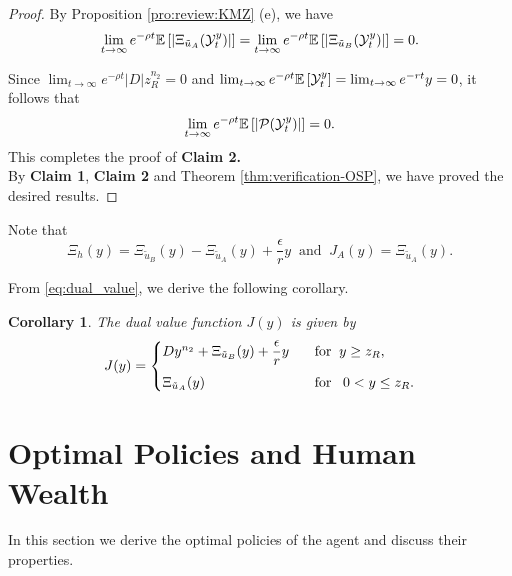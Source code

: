 \documentclass[a4paper,report, 11pt]{article}
\newtheorem{cor}{Corollary}[section]
\def\e{\epsilon}
\begin{document}
\begin{proof}
	By Proposition \ref{pro:review:KMZ} (e), we have 
	\begin{equation*}
		\lim_{t\to\infty}e^{-\rho t}\mathbb{E}\left[|\Xi_{\tilde{u}_A}({\cal Y}_t^y)|\right]=	\lim_{t\to\infty}e^{-\rho t}\mathbb{E}\left[|\Xi_{\tilde{u}_B}({\cal Y}_t^y)|\right]=0.
	\end{equation*}
	
	Since $\lim_{t\to\infty} e^{-\rho t}|D|z_R^{n_2}=0$ and $\lim_{t\to\infty}e^{-\rho t}\mathbb{E}\left[{\cal Y}_t^y\right]=\lim_{t\to\infty} e^{-rt}y=0$, it follows that 
	\begin{equation*}
	\lim_{t\to\infty}e^{-\rho t}\mathbb{E}\left[|{\cal P}({\cal Y}_t^y)|\right]=0.
	\end{equation*}
	This completes the proof of {\bf Claim 2.}\\
	
	\noindent By {\bf Claim 1}, {\bf Claim 2} and Theorem \ref{thm:verification-OSP},  we have proved the desired results.
\end{proof}

Note that 
\begin{equation*}
\Xi_h(y) = \Xi_{\tilde{u}_B}(y)-\Xi_{\tilde{u}_A}(y)+\dfrac{\e}{r}y\;\;\mbox{and}\;\;J_A(y)=\Xi_{\tilde{u}_A}(y).
\end{equation*}

From \eqref{eq:dual_value}, we derive the following corollary.
\begin{cor}\label{cor:dual}
	The dual value function $J(y)$ is given by 
	\begin{eqnarray}\label{eq:form_J}
	\begin{split}
	J(y)=
	\begin{cases}
	Dy^{n_2}+\Xi_{\tilde{u}_B}(y)+\dfrac{\e}{r}y\;\;\;&\mbox{for}\;\;y\ge z_R,\vspace{2mm}\\
\Xi_{\tilde{u}_A}(y)\;\;\;&\mbox{for}\;\;\;0<y\le z_R.
	\end{cases}
	\end{split}
	\end{eqnarray}
\end{cor}

%
%
\section{ Optimal Policies and Human Wealth}\label{sec:optimal_policies}


In this section we derive the optimal policies of the agent and discuss their properties. 
\end{document}
